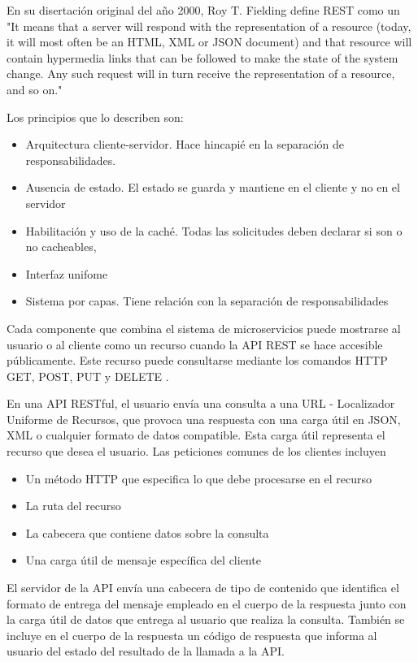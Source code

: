 En su disertación original del año 2000, Roy T. Fielding define REST como un "It means that a server will respond with the representation of a resource (today, it will most often be an HTML, XML or JSON document) and that resource will contain hypermedia links that can be followed to make the state of the system change. Any such request will in turn receive the representation of a resource, and so on." \cite{FieldingRoyThomas2000Asat}

Los principios que lo describen son:

\begin{itemize}
    \item Arquitectura cliente-servidor. Hace hincapié en la separación de responsabilidades.
    \item Ausencia de estado. El estado se guarda y mantiene en el cliente y no en el servidor
    \item Habilitación y uso de la caché. Todas las solicitudes deben declarar si son o no cacheables,
    \item Interfaz unifome
    \item Sistema por capas. Tiene relación con la separación de responsabilidades
\end{itemize}

Cada componente que combina el sistema de microservicios puede mostrarse al usuario o al cliente como un recurso cuando la API REST se hace accesible públicamente. Este recurso puede consultarse mediante los comandos HTTP GET, POST, PUT y DELETE .

En una API RESTful, el usuario envía una consulta a una URL - Localizador Uniforme de Recursos, que provoca una respuesta con una carga útil en JSON, XML o cualquier formato de datos compatible. Esta carga útil representa el recurso que desea el usuario. Las peticiones comunes de los clientes incluyen

\begin{itemize}
    \item Un método HTTP que especifica lo que debe procesarse en el recurso
    \item La ruta del recurso
    \item La cabecera que contiene datos sobre la consulta
    \item Una carga útil de mensaje específica del cliente
\end{itemize}

El servidor de la API envía una cabecera de tipo de contenido que identifica el formato de entrega del mensaje empleado en el cuerpo de la respuesta junto con la carga útil de datos que entrega al usuario que realiza la consulta. También se incluye en el cuerpo de la respuesta un código de respuesta que informa al usuario del estado del resultado de la llamada a la API.

